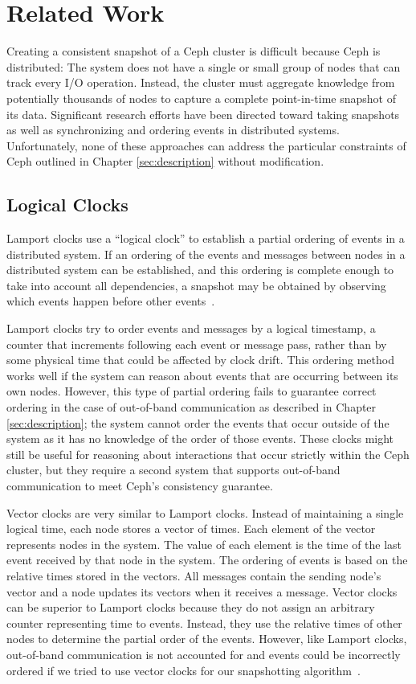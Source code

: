 \chapter{Related Work}
\label{sec:rel-work}

Creating a consistent snapshot of a Ceph cluster is difficult because
Ceph is distributed: The system does not have a single or small group
of nodes that can track every I/O operation. Instead, the cluster must
aggregate knowledge from potentially thousands of nodes to capture a
complete point-in-time snapshot of its data.  Significant research
efforts have been directed toward taking snapshots as well as
synchronizing and ordering events in distributed
systems. Unfortunately, none of these approaches can address the
particular constraints of Ceph outlined in Chapter
\ref{sec:description} without modification.

\section{Logical Clocks}

Lamport clocks use a ``logical clock'' to establish a partial ordering
of events in a distributed system. If an ordering of the events and
messages between nodes in a distributed system can be established, and
this ordering is complete enough to take into account all
dependencies, a snapshot may be obtained by observing which events
happen before other events~\citep{Lamport1978}.

Lamport clocks try to order events and messages by a logical
timestamp, a counter that increments following each event or message
pass, rather than by some physical time that could be affected by
clock drift. This ordering method works well if the system can reason
about events that are occurring between its own nodes. However, this
type of partial ordering fails to guarantee correct ordering in the
case of out-of-band communication as described in Chapter
\ref{sec:description}; the system cannot order the events that occur
outside of the system as it has no knowledge of the order of those
events. These clocks might still be useful for reasoning about
interactions that occur strictly within the Ceph cluster, but they
require a second system that supports out-of-band communication to
meet Ceph's consistency guarantee.

Vector clocks are very similar to Lamport clocks. Instead of
maintaining a single logical time, each node stores a vector of
times. Each element of the vector represents nodes in the
system.  The value of each element is the time of the last event
received by that node in the system. The ordering of events is
based on the relative times stored in the vectors. All messages
contain the sending node's vector and a node updates its vectors when
it receives a message. Vector clocks can be superior to Lamport clocks
because they do not assign an arbitrary counter
representing time to events. Instead, they use the relative times of
other nodes to determine the partial order of the events. However,
like Lamport clocks, out-of-band communication is not accounted for
and events could be incorrectly ordered if we tried to use vector clocks for 
our snapshotting algorithm~\citep{Fidge1988}.

